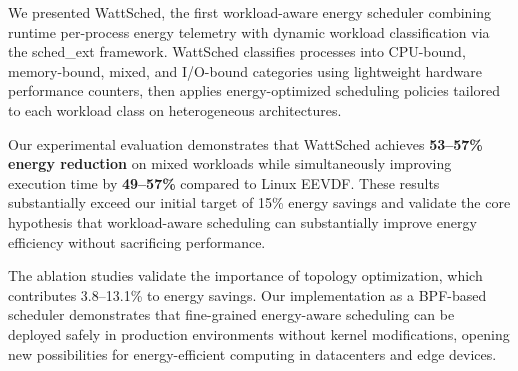 \documentclass{article}
\begin{document}
We presented WattSched, the first workload-aware energy scheduler combining runtime per-process energy telemetry with dynamic workload classification via the sched\_ext framework. WattSched classifies processes into CPU-bound, memory-bound, mixed, and I/O-bound categories using lightweight hardware performance counters, then applies energy-optimized scheduling policies tailored to each workload class on heterogeneous architectures.

Our experimental evaluation demonstrates that WattSched achieves \textbf{53--57\% energy reduction} on mixed workloads while simultaneously improving execution time by \textbf{49--57\%} compared to Linux EEVDF. These results substantially exceed our initial target of 15\% energy savings and validate the core hypothesis that workload-aware scheduling can substantially improve energy efficiency without sacrificing performance.

The ablation studies validate the importance of topology optimization, which contributes 3.8--13.1\% to energy savings. Our implementation as a BPF-based scheduler demonstrates that fine-grained energy-aware scheduling can be deployed safely in production environments without kernel modifications, opening new possibilities for energy-efficient computing in datacenters and edge devices.
\end{document}
